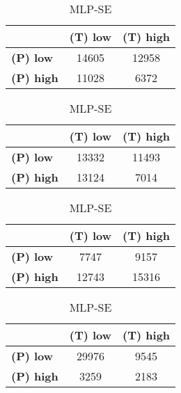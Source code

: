 \begin{landscape}
\begin{table}[htbp]
\begin{minipage}{.3\textwidth}
\tiny
\caption*{MLP-AP}
\begin{tabular}{|l|c|c|}
\hline
					& \textbf{(T) low}	& \textbf{(T) high}	\\ \hline
\textbf{(P) low}	& 14605				& 12958				\\ \hline
\textbf{(P) high}	& 11028				& 6372				\\ \hline
\end{tabular}
\end{minipage}\hfill
\begin{minipage}{.3\textwidth}
\tiny
\caption*{MLP-AT}
\begin{tabular}{|l|c|c|}
\hline
					& \textbf{(T) low}	& \textbf{(T) high}	\\ \hline
\textbf{(P) low}	& 13332				& 11493				\\ \hline
\textbf{(P) high}	& 13124				& 7014				\\ \hline
\end{tabular}
\end{minipage}\hfill
\begin{minipage}{.3\textwidth}
\tiny
\caption*{MLP-PL}
\begin{tabular}{|l|c|c|}
\hline
					& \textbf{(T) low}	& \textbf{(T) high}	\\ \hline
\textbf{(P) low}	& 7747				& 9157				\\ \hline
\textbf{(P) high}	& 12743				& 15316				\\ \hline
\end{tabular}
\end{minipage}\hfill
\begin{minipage}{.3\textwidth}
\tiny
\caption*{MLP-SE}
\begin{tabular}{|l|c|c|}
\hline
					& \textbf{(T) low}	& \textbf{(T) high}	\\ \hline
\textbf{(P) low}	& 29976				& 9545				\\ \hline
\textbf{(P) high}	& 3259				& 2183				\\ \hline
\end{tabular}
\end{minipage}\hfill
\end{table}
\end{landscape}